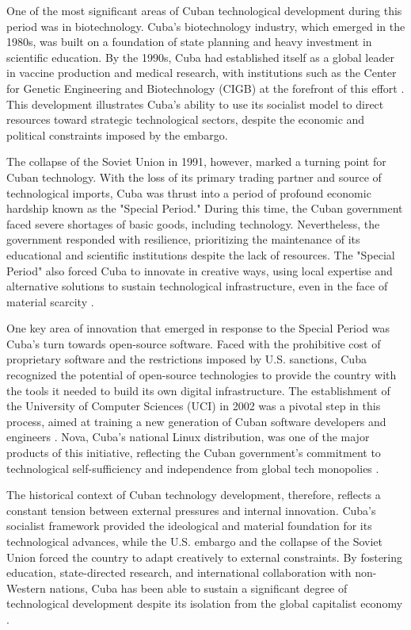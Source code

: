 \begin{refsection}
One of the most significant areas of Cuban technological development during this period was in biotechnology. Cuba's biotechnology industry, which emerged in the 1980s, was built on a foundation of state planning and heavy investment in scientific education. By the 1990s, Cuba had established itself as a global leader in vaccine production and medical research, with institutions such as the Center for Genetic Engineering and Biotechnology (CIGB) at the forefront of this effort \cite[pp.~67-85]{feinberg}. This development illustrates Cuba's ability to use its socialist model to direct resources toward strategic technological sectors, despite the economic and political constraints imposed by the embargo.

The collapse of the Soviet Union in 1991, however, marked a turning point for Cuban technology. With the loss of its primary trading partner and source of technological imports, Cuba was thrust into a period of profound economic hardship known as the "Special Period." During this time, the Cuban government faced severe shortages of basic goods, including technology. Nevertheless, the government responded with resilience, prioritizing the maintenance of its educational and scientific institutions despite the lack of resources. The "Special Period" also forced Cuba to innovate in creative ways, using local expertise and alternative solutions to sustain technological infrastructure, even in the face of material scarcity \cite[pp.~98-123]{kapcia}.

One key area of innovation that emerged in response to the Special Period was Cuba's turn towards open-source software. Faced with the prohibitive cost of proprietary software and the restrictions imposed by U.S. sanctions, Cuba recognized the potential of open-source technologies to provide the country with the tools it needed to build its own digital infrastructure. The establishment of the University of Computer Sciences (UCI) in 2002 was a pivotal step in this process, aimed at training a new generation of Cuban software developers and engineers \cite[pp.~23-45]{feinberg}. Nova, Cuba’s national Linux distribution, was one of the major products of this initiative, reflecting the Cuban government’s commitment to technological self-sufficiency and independence from global tech monopolies \cite[pp.~45-67]{feinberg}.

The historical context of Cuban technology development, therefore, reflects a constant tension between external pressures and internal innovation. Cuba's socialist framework provided the ideological and material foundation for its technological advances, while the U.S. embargo and the collapse of the Soviet Union forced the country to adapt creatively to external constraints. By fostering education, state-directed research, and international collaboration with non-Western nations, Cuba has been able to sustain a significant degree of technological development despite its isolation from the global capitalist economy \cite[pp.~90-110]{kapcia}.


\end{refsection}
